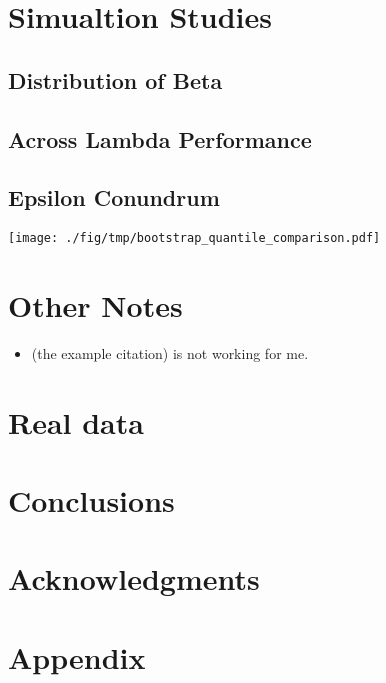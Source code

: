 \section{Simualtion Studies}

\subsection{Distribution of Beta}

\subsection{Across Lambda Performance}

\subsection{Epsilon Conundrum}
\texttt{[image: ./fig/tmp/bootstrap\_quantile\_comparison.pdf]}




\section{Other Notes}

\begin{itemize}
\item \cite{Tibshirani1996} (the example citation) is not working for me.
\end{itemize}

\section{Real data}

\section{Conclusions}

\section*{Acknowledgments}

\section*{Appendix}
